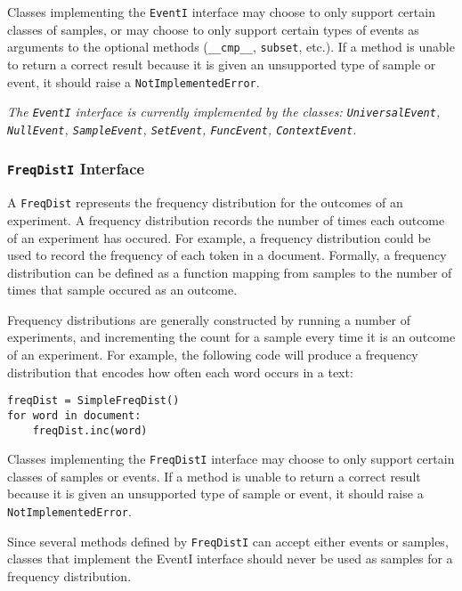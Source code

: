 \documentclass{article}
\begin{document}
    Classes implementing the \texttt{EventI} interface may choose
    to only support certain classes of samples, or may choose to only
    support certain types of events as arguments to the optional
    methods (\texttt{\_\_cmp\_\_}, \texttt{subset}, etc.).  If a
    method is unable to return a correct result because it is given an 
    unsupported type of sample or event, it should raise a
    \texttt{NotImplementedError}.

\vspace{2mm}\noindent
\textit{The \texttt{EventI} interface is currently implemented by the
classes: \texttt{UniversalEvent}, \texttt{NullEvent},
\texttt{SampleEvent}, \texttt{SetEvent}, \texttt{FuncEvent},
\texttt{ContextEvent}.}

\subsubsection{\texttt{FreqDistI} Interface}

    A \texttt{FreqDist} represents the frequency distribution for the
    outcomes of an experiment.  A frequency distribution records the
    number of times each outcome of an experiment has occured.  For
    example, a frequency distribution could be used to record the
    frequency of each token in a document.  Formally, a frequency
    distribution can be defined as a function mapping from samples to
    the number of times that sample occured as an outcome.

    Frequency distributions are generally constructed by running a
    number of experiments, and incrementing the count for a sample
    every time it is an outcome of an experiment.  For example, the
    following code will produce a frequency distribution that encodes
    how often each word occurs in a text:
    
\begin{verbatim}
freqDist = SimpleFreqDist()
for word in document:
    freqDist.inc(word)
\end{verbatim}

    Classes implementing the \texttt{FreqDistI} interface may
    choose to only support certain classes of samples or events.  If a
    method is unable to return a correct result because it is given an
    unsupported type of sample or event, it should raise a
    \texttt{NotImplementedError}.

    Since several methods defined by \texttt{FreqDistI} can accept
    either events or samples, classes that implement the EventI
    interface should never be used as samples for a frequency
    distribution.
\end{document}
